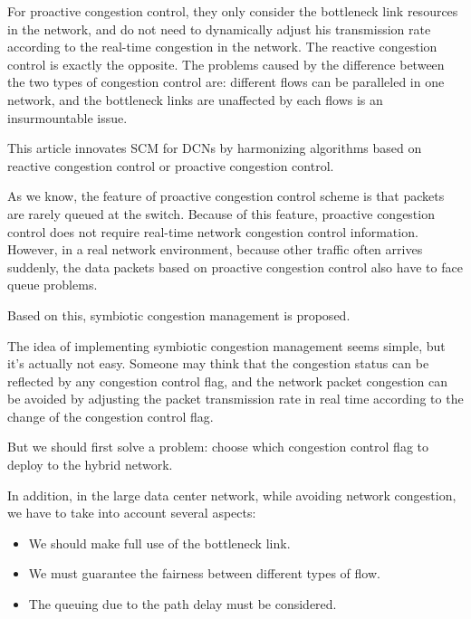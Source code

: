 \documentclass[conference]{IEEEtran}
\begin{document}
\indent For proactive congestion control, they only consider the bottleneck link resources in the network, and do not need to dynamically adjust his transmission rate according to the real-time congestion in the network\cite{perry2015fastpass}\cite{gao2015phost}\cite{cho2017credit}. The reactive congestion control is exactly the opposite.  The problems caused by the difference between the two types of congestion control are: different flows can be paralleled in one network, and the bottleneck links are unaffected by each flows is an insurmountable issue.

\indent This article innovates SCM for DCNs by harmonizing algorithms based on reactive congestion control or proactive congestion control.

\indent As we know, the feature of proactive congestion control scheme is that packets are rarely queued at the switch. Because of this feature, proactive congestion control does not require real-time network congestion control information. However, in a real network environment, because other traffic often arrives suddenly, the data packets based on proactive congestion control also have to face queue problems.

\indent Based on this, symbiotic congestion management is proposed.

\indent The idea of implementing symbiotic congestion management seems simple, but it's actually not easy. Someone may think that the congestion status can be reflected by any congestion control flag, and the network packet congestion can be avoided by adjusting the packet transmission rate in real time according to the change of the congestion control flag.

\indent But we should first solve a problem: choose which congestion control flag to deploy to the hybrid network.

\indent In addition, in the large data center network, while avoiding network congestion, we have to take into account several aspects:

\begin{itemize}

\item We should make full use of the bottleneck link.

\item We must guarantee the fairness between different types of flow.

\item The queuing due to the path delay must be considered.

\end{itemize}
\end{document}
